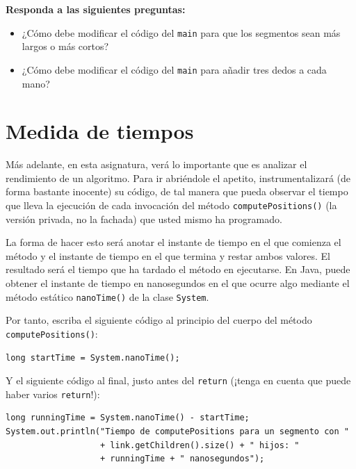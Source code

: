 \documentclass[10pt,a4paper,spanish]{article}
\newcommand{\code}[1]{\texttt{#1}}
\begin{document}
\textbf{Responda a las siguientes preguntas:}

\begin{itemize}
    \item ¿Cómo debe modificar el código del \code{main} para que los segmentos sean más largos o más cortos?
    \item ¿Cómo debe modificar el código del \code{main} para añadir tres dedos a cada mano?
\end{itemize}

\section{Medida de tiempos}

Más adelante, en esta asignatura, verá lo importante que es analizar el rendimiento de un algoritmo. Para ir abriéndole el apetito, instrumentalizará (de forma bastante inocente) su código, de tal manera que pueda observar el tiempo que lleva la ejecución de cada invocación del método \code{computePositions()} (la versión privada, no la fachada) que usted mismo ha programado.

La forma de hacer esto será anotar el instante de tiempo en el que comienza el método y el instante de tiempo en el que termina y restar ambos valores. El resultado será el tiempo que ha tardado el método en ejecutarse. En Java, puede obtener el instante de tiempo en nanosegundos en el que ocurre algo mediante el método estático \code{nanoTime()} de la clase \code{System}.

Por tanto, escriba el siguiente código al principio del cuerpo del método \code{computePositions()}:

\begin{verbatim}
long startTime = System.nanoTime();
\end{verbatim}

Y el siguiente código al final, justo antes del \code{return} (¡tenga en cuenta que puede haber varios \code{return}!):

\begin{verbatim}
long runningTime = System.nanoTime() - startTime;
System.out.println("Tiempo de computePositions para un segmento con "
                   + link.getChildren().size() + " hijos: "
                   + runningTime + " nanosegundos");
\end{verbatim}
\end{document}
